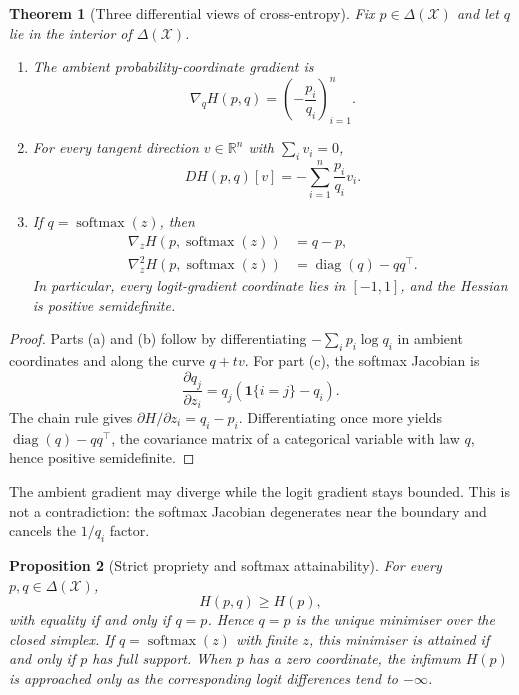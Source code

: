 \documentclass[11pt,a4paper]{article}
\newtheorem{theorem}{Theorem}[section]
\newtheorem{proposition}[theorem]{Proposition}
\theoremstyle{definition}
\theoremstyle{remark}
\newcommand{\simplex}{\Delta(\mathcal X)}
\begin{document}
\begin{theorem}[Three differential views of cross-entropy]
\label{thm:gradients}
Fix $p\in\simplex$ and let $q$ lie in the interior of $\simplex$.
\begin{enumerate}[label=(\alph*)]
  \item The ambient probability-coordinate gradient is
  \[
    \nabla_q H(p,q)
    = \left(-\frac{p_i}{q_i}\right)_{i=1}^n.
  \]
  \item For every tangent direction $v\in\mathbb R^n$ with $\sum_i v_i=0$,
  \[
    D H(p,q)[v]
    = -\sum_{i=1}^n\frac{p_i}{q_i}v_i.
  \]
  \item If $q=\operatorname{softmax}(z)$, then
  \begin{align}
    \nabla_z H(p,\operatorname{softmax}(z)) &= q-p, \\
    \nabla_z^2 H(p,\operatorname{softmax}(z))
      &= \operatorname{diag}(q)-qq^\top.
  \end{align}
  In particular, every logit-gradient coordinate lies in $[-1,1]$, and the Hessian is positive semidefinite.
\end{enumerate}
\end{theorem}

\begin{proof}
Parts (a) and (b) follow by differentiating $-\sum_i p_i\log q_i$ in ambient coordinates and along the curve $q+tv$.
For part (c), the softmax Jacobian is
\[
  \frac{\partial q_j}{\partial z_i}=q_j(\mathbf 1\{i=j\}-q_i).
\]
The chain rule gives $\partial H/\partial z_i=q_i-p_i$.
Differentiating once more yields $\operatorname{diag}(q)-qq^\top$, the covariance matrix of a categorical variable with law $q$, hence positive semidefinite.
\end{proof}

The ambient gradient may diverge while the logit gradient stays bounded.
This is not a contradiction: the softmax Jacobian degenerates near the boundary and cancels the $1/q_i$ factor.

\begin{proposition}[Strict propriety and softmax attainability]
\label{prop:proper}
For every $p,q\in\simplex$,
\[
  H(p,q)\ge H(p),
\]
with equality if and only if $q=p$.
Hence $q=p$ is the unique minimiser over the closed simplex.
If $q=\operatorname{softmax}(z)$ with finite $z$, this minimiser is attained if and only if $p$ has full support.
When $p$ has a zero coordinate, the infimum $H(p)$ is approached only as the corresponding logit differences tend to $-\infty$.
\end{proposition}
\end{document}
